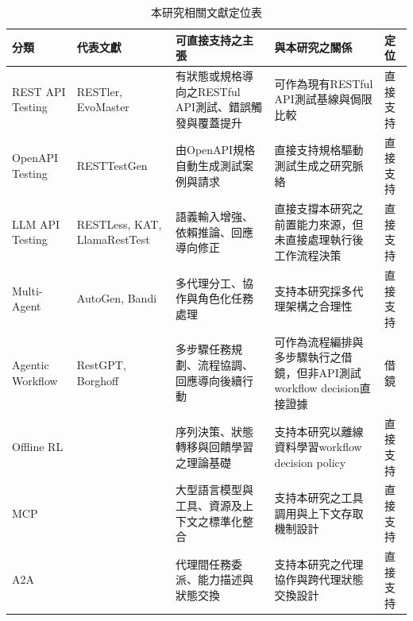 \begin{ZhChapter}
\begin{table}[htbp]
\centering
\caption{本研究相關文獻定位表}
\label{tab:related_work_positioning}
\scriptsize
\renewcommand{\arraystretch}{1.35}
\begin{tabularx}{\textwidth}{>{\raggedright\arraybackslash}p{2.3cm} >{\raggedright\arraybackslash}p{3.0cm} >{\raggedright\arraybackslash}p{2.9cm} >{\raggedright\arraybackslash}X >{\centering\arraybackslash}p{1.7cm}}
\toprule
\textbf{分類} & \textbf{代表文獻} & \textbf{可直接支持之主張} & \textbf{與本研究之關係} & \textbf{定位} \\
\midrule
REST API Testing & RESTler\parencite{Atlidakis2019RESTler}, EvoMaster\parencite{Arcuri2021Automated} & 有狀態或規格導向之RESTful API測試、錯誤觸發與覆蓋提升 & 可作為現有RESTful API測試基線與侷限比較 & 直接支持 \\
OpenAPI Testing & RESTTestGen\parencite{Corradini2022RestTestGen,Viglianisi2020RESTTESTGEN} & 由OpenAPI規格自動生成測試案例與請求 & 直接支持規格驅動測試生成之研究脈絡 & 直接支持 \\
LLM API Testing & RESTLess\parencite{Zheng2024RESTLess}, KAT\parencite{Nguyen2024KAT}, LlamaRestTest\parencite{Kim2025LlamaRestTest} & 語義輸入增強、依賴推論、回應導向修正 & 直接支撐本研究之前置能力來源，但未直接處理執行後工作流程決策 & 直接支持 \\
Multi-Agent & AutoGen\parencite{Wu2023AutoGen}, Bandi\parencite{Bandi2025Rise} & 多代理分工、協作與角色化任務處理 & 支持本研究採多代理架構之合理性 & 直接支持 \\
Agentic Workflow & RestGPT\parencite{Song2023RestGPT}, Borghoff\parencite{Borghoff2025Beyond} & 多步驟任務規劃、流程協調、回應導向後續行動 & 可作為流程編排與多步驟執行之借鏡，但非API測試workflow decision直接證據 & 借鏡 \\
Offline RL & \parencite{rao2022foundations} & 序列決策、狀態轉移與回饋學習之理論基礎 & 支持本研究以離線資料學習workflow decision policy & 直接支持 \\
MCP & \parencite{Ehtesham2025SurveyMCPACPA2AANP,Hou2025MCP} & 大型語言模型與工具、資源及上下文之標準化整合 & 支持本研究之工具調用與上下文存取機制設計 & 直接支持 \\
A2A & \parencite{Ehtesham2025SurveyMCPACPA2AANP,Tupe2024MultiAgentCollaboration} & 代理間任務委派、能力描述與狀態交換 & 支持本研究之代理協作與跨代理狀態交換設計 & 直接支持 \\
\bottomrule
\end{tabularx}
\end{table}


\end{ZhChapter}
